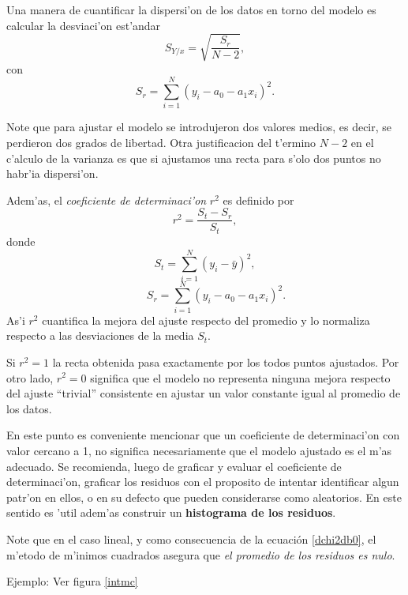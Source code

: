 \documentclass[letterpaper,11pt]{report}
\begin{document}
Una manera de cuantificar la dispersi'on de los datos en torno del modelo es calcular la desviaci'on est'andar
\begin{equation}
S_{Y/x} = \sqrt{\dfrac{S_{r}}{N-2}},
\end{equation}
con 
\begin{equation}
S_{r}= \sum_{i=1}^N (y_{i} - a_0 - a_1 x_{i})^{2}.
\end{equation}

Note que para ajustar el modelo se introdujeron dos valores medios, es decir, se perdieron dos grados de libertad. Otra justificacion del t'ermino $N-2$ en el c'alculo de la varianza es que si ajustamos una recta para s'olo dos puntos no habr'ia dispersi'on.


Adem'as, el \textit{coeficiente de determinaci'on} $r^2$ es definido por
\begin{equation}\label{r2}
r^2 = \dfrac{S_{t} - S_{r}}{S_{t}},
\end{equation}
donde 
\begin{equation}\label{St}
S_t = \sum_{i=1}^N\left(y_i-\bar{y}\right)^2, 
\end{equation}
\begin{equation}
\qquad S_{r}= \sum_{i=1}^N (y_{i} - a_0 - a_1 x_{i})^{2}.
\end{equation}
As'i $r^{2}$ cuantifica la mejora del ajuste respecto del promedio y lo normaliza respecto a las desviaciones de la media $S_t$.

Si $r^{2}=1$ la recta obtenida pasa exactamente por los todos puntos ajustados. Por otro lado, $r^{2}=0$ significa que el modelo no representa ninguna mejora respecto del ajuste ``trivial'' consistente en ajustar un valor constante igual al promedio de los datos.

En este punto es conveniente mencionar que un coeficiente de determinaci'on con valor cercano a 1, no significa necesariamente que el modelo ajustado es el m'as adecuado. Se recomienda, luego de graficar y evaluar el coeficiente de determinaci'on, graficar los residuos con el proposito de intentar identificar algun patr'on en ellos, o en su defecto que pueden considerarse como aleatorios. En este sentido es 'util adem'as construir un \textbf{histograma de los residuos}.

Note que en el caso lineal, y como consecuencia de la ecuación \eqref{dchi2db0}, el m'etodo de m'inimos cuadrados asegura que \textit{el promedio de los residuos es nulo}.

Ejemplo: Ver figura \ref{intmc}
\end{document}
